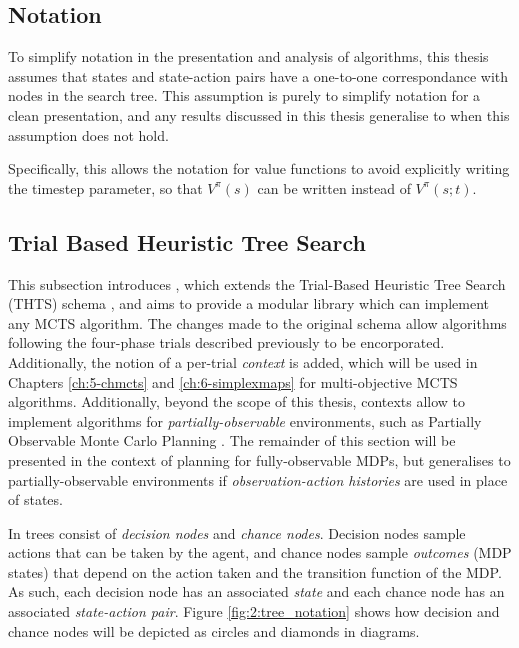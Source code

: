     


    




    \subsection{Notation}
    \label{sec:2-4-0-notation}
        To simplify notation in the presentation and analysis of \thtspp\ewe algorithms, this thesis assumes that states and state-action pairs have a one-to-one correspondance with nodes in the search tree. This assumption is purely to simplify notation for a clean presentation, and any results discussed in this thesis generalise to when this assumption does not hold. 

        Specifically, this allows the notation for value functions to avoid explicitly writing the timestep parameter, so that $V^{\pi}(s)$ can be written instead of $V^{\pi}(s;t)$.






    \subsection{Trial Based Heuristic Tree Search}
    \label{sec:2-4-1-thts}

        This subsection introduces \thtspp\ewe, which extends the Trial-Based Heuristic Tree Search (THTS) schema \cite{thts}, and aims to provide a modular library which can implement any MCTS algorithm. The changes made to the original schema allow algorithms following the four-phase \mctsone\ewe trials described previously to be encorporated. Additionally, the notion of a per-trial \textit{context} is added, which will be used in Chapters \ref{ch:5-chmcts} and \ref{ch:6-simplexmaps} for multi-objective MCTS algorithms. Additionally, beyond the scope of this thesis, contexts allow \thtspp\ewe to implement algorithms for \textit{partially-observable} environments, such as Partially Observable Monte Carlo Planning \cite{pomcp}. The remainder of this section will be presented in the context of planning for fully-observable MDPs, but \thtspp\ewe generalises to partially-observable environments if \textit{observation-action histories} are used in place of states.

        In \thtspp\ewe trees consist of \textit{decision nodes} and \textit{chance nodes}. Decision nodes sample actions that can be taken by the agent, and chance nodes sample \textit{outcomes} (MDP states) that depend on the action taken and the transition function of the MDP. As such, each decision node has an associated \textit{state} and each chance node has an associated \textit{state-action pair}. Figure \ref{fig:2:tree_notation} shows how decision and chance nodes will be depicted as circles and diamonds in diagrams.

